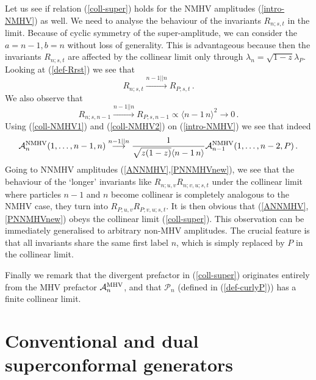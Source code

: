 \documentclass[12pt]{article}
\def \be  {\begin{equation}}
\def \ee  {\end{equation}}
\newcommand \vev [1] {\langle{#1}\rangle}
\begin{document}
{Let us see if relation (\ref{coll-super}) holds for the NMHV
amplitudes (\ref{intro-NMHV}) as well. We need to analyse the
behaviour of the invariants $R_{n;s,t}$ in the limit. Because of
cyclic symmetry of the super-amplitude, we can consider the
$a=n-1,b=n$ without loss of generality. This is advantageous
because then the invariants $R_{n;s,t}$ are affected by the
collinear limit only through  $\lambda_{n} = \sqrt{1-z}
\lambda_{P}$. Looking at (\ref{def-Rrst}) we see that \be
\label{coll-NMHV1} R_{n;s,t} \stackrel{n-1 ||n}{\longrightarrow}
R_{P;s,t}\,. \ee We also observe that \be\label{coll-NMHV2}
R_{n;s,n-1}  \stackrel{n-1 ||n}{\longrightarrow} R_{P;s,n-1}
\propto \vev{n-1\,n}^2 \to 0\,. \ee Using (\ref{coll-NMHV1}) and
(\ref{coll-NMHV2}) on (\ref{intro-NMHV}) we see that indeed \be
\mathcal{A}^{\rm NMHV}_{n}(1,\ldots,n-1,n)
 \stackrel{n-1 ||n}{\longrightarrow} \frac{1}{\sqrt{z (1-z)}
\vev{n-1\,n}} \mathcal{A}^{\rm NMHV}_{n-1}(1,\ldots,n-2,P)\,. \ee
Going to NNMHV amplitudes (\ref{ANNMHV},\ref{PNNMHVnew}), we see that the behaviour of the `longer' invariants like
$R_{n;u,v}R_{n;v,u;s,t}$
under the collinear limit where particles $n-1$ and $n$ become collinear
is completely analogous to the NMHV case, they turn into $R_{P;u,v}R_{P;v,u;s,t}$. It is then
obvious that (\ref{ANNMHV},\ref{PNNMHVnew}) obeys the collinear limit (\ref{coll-super}).
This observation can be immediately generalised to arbitrary non-MHV amplitudes.
The crucial feature is that all invariants share the same first label $n$, which is
simply replaced by $P$ in the collinear limit.

Finally we remark that the
divergent prefactor in (\ref{coll-super}) originates entirely from the
MHV prefactor $\mathcal{A}^{\rm MHV}_n$, and that $\mathcal{P}_n$ (defined in
(\ref{def-curlyP})) has a finite collinear limit.


\section{Conventional and dual superconformal generators} \label{app-generators}

}
\end{document}
